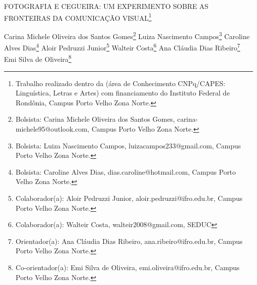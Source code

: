 \documentclass[article,12pt,onesidea,4paper,english,brazil]{abntex2}
\begin{document}
	
	
	\frenchspacing 
	
	\begin{center}
		\LARGE FOTOGRAFIA E CEGUEIRA: UM EXPERIMENTO SOBRE AS FRONTEIRAS DA COMUNICAÇÃO VISUAL\footnote{Trabalho realizado dentro da (área de Conhecimento CNPq/CAPES: Linguística, Letras e Artes) com financiamento do Instituto Federal de Rondônia, Campus Porto Velho Zona Norte.}
		
		\normalsize
		Carina Michele Oliveira dos Santos Gomes\footnote{Bolsista: Carina Michele Oliveira dos Santos Gomes, carina-michele95@outlook.com, Campus Porto Velho Zona Norte.} 
		Luiza Nascimento Campos\footnote{Bolsista: Luiza Nascimento Campos, luizacampos233@gmail.com, Campus Porto Velho Zona Norte.} 
		Caroline Alves Dias\footnote{Bolsista: Caroline Alves Dias, dias.caroline@hotmail.com, Campus Porto Velho Zona Norte.} 
		Aloir Pedruzzi Junior\footnote{Colaborador(a): Aloir Pedruzzi Junior, aloir.pedruzzi@ifro.edu.br, Campus Porto Velho Zona Norte.}
		Walteir Costa\footnote{Colaborador(a): Walteir Costa, walteir2008@gmail.com, SEDUC }
		Ana Cláudia Dias Ribeiro\footnote{Orientador(a): Ana Cláudia Dias Ribeiro, ana.ribeiro@ifro.edu.br, Campus Porto Velho Zona Norte.}
		Emi Silva de Oliveira\footnote{Co-orientador(a): Emi Silva de Oliveira, emi.oliveira@ifro.edu.br, Campus Porto Velho Zona Norte.} 
	\end{center}
	
\end{document}
